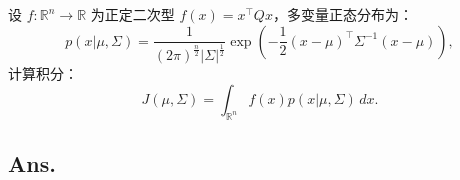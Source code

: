 \begin{example}
    设 \( f: \mathbb{R}^n \to \mathbb{R} \) 为正定二次型 \( f(x) = x^\top Q x \)，多变量正态分布为：
    \[
    p(x|\mu, \Sigma) = \frac{1}{(2\pi)^{\frac{n}{2}} |\Sigma|^{\frac{1}{2}}} \exp \left( -\frac{1}{2}(x - \mu)^\top \Sigma^{-1}(x - \mu) \right),
    \]
    计算积分：
    \[
    J(\mu, \Sigma) = \int_{\mathbb{R}^n} f(x) p(x|\mu, \Sigma) \, dx.
    \]
    \end{example}

    \subsection*{Ans.}
    